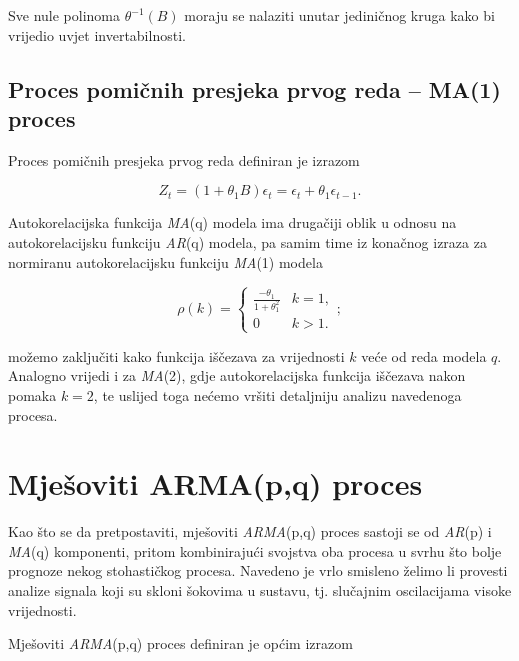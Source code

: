 \documentclass[a4paper,12pt,oneside]{memoir}
\begin{document}
            Sve nule polinoma $\theta^{-1}(B)$ moraju se nalaziti unutar jediničnog kruga kako bi vrijedio uvjet invertabilnosti.

            \subsection{Proces pomičnih presjeka prvog reda -- MA(1) proces}

                Proces pomičnih presjeka prvog reda definiran je izrazom

                \begin{equation}
                    Z_t=(1+\theta_1B)\epsilon_t=\epsilon_t+\theta_1\epsilon_{t-1}.
                \end{equation}

                Autokorelacijska funkcija \textit{MA}(q) modela ima drugačiji oblik u odnosu na autokorelacijsku funkciju \textit{AR}(q) modela, pa samim time iz konačnog izraza za normiranu autokorelacijsku funkciju \textit{MA}(1) modela

                \begin{equation}
                    \rho(k)=
                    \begin{cases}
                       \frac{-\theta_1}{1+\theta_1^2}   &   k=1,\\
                        0   &   k>1.
                    \end{cases};
                \end{equation}

                možemo zaključiti kako funkcija iščezava za vrijednosti $k$ veće od reda modela $q$. Analogno vrijedi i za \textit{MA}(2), gdje autokorelacijska funkcija iščezava nakon pomaka $k=2$, te uslijed toga nećemo vršiti detaljniju analizu navedenoga procesa.

        \section{Mješoviti ARMA(p,q) proces}

            Kao što se da pretpostaviti, mješoviti \textit{ARMA}(p,q) proces sastoji se od \textit{AR}(p) i \textit{MA}(q) komponenti, pritom kombinirajući svojstva oba procesa u svrhu što bolje prognoze nekog stohastičkog procesa. Navedeno je vrlo smisleno želimo li provesti analize signala koji su skloni šokovima u sustavu, tj. slučajnim oscilacijama visoke vrijednosti.  

            Mješoviti \textit{ARMA}(p,q) proces definiran je općim izrazom
\end{document}
